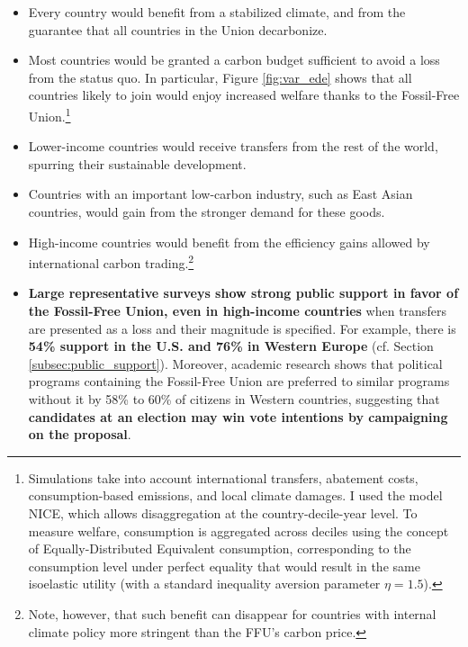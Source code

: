 \documentclass[12pt,english]{article}
\begin{document}
\begin{itemize}
  \item Every country would benefit from a stabilized climate, and from the guarantee that all countries in the Union decarbonize.
  \item Most countries would be granted a carbon budget sufficient to avoid a loss from the status quo. In particular, Figure \ref{fig:var_ede} shows that all countries likely to join would enjoy increased welfare thanks to the Fossil-Free Union.\footnote{\label{ede}Simulations take into account international transfers, abatement costs, consumption-based emissions, and local climate damages. I used the model NICE,\citep{young-brun_within-country_2025} which allows disaggregation at the country-decile-year level. To measure welfare, consumption is aggregated across deciles using the concept of Equally-Distributed Equivalent consumption, corresponding to the consumption level under perfect equality that would result in the same  isoelastic utility (with a standard inequality aversion parameter $\eta=1.5$).} %
  \item Lower-income countries would receive transfers from the rest of the world, spurring their sustainable development.
  \item Countries with an important low-carbon industry, such as East Asian countries, would gain from the stronger demand for these goods.
  \item High-income countries would benefit from the efficiency gains allowed by international carbon trading.\footnote{Note, however, that such benefit can disappear for countries with internal climate policy more stringent than the FFU's carbon price.}
  \item \textbf{Large representative surveys show strong public support in favor of the Fossil-Free Union, even in high-income countries} when transfers are presented as a loss and their magnitude is specified. For example, there is\textbf{ 54\% support in the U.S. and 76\% in Western Europe} (cf. Section \ref{subsec:public_support}).\cite{fabre_majority_2025} 
  Moreover, academic research shows that political programs containing the Fossil-Free Union are preferred to similar programs without it by 58\% to 60\% of citizens in Western countries, suggesting that \textbf{candidates at an election may win vote intentions by campaigning on the proposal}.\cite{fabre_majority_2025}
\end{itemize}
\end{document}
